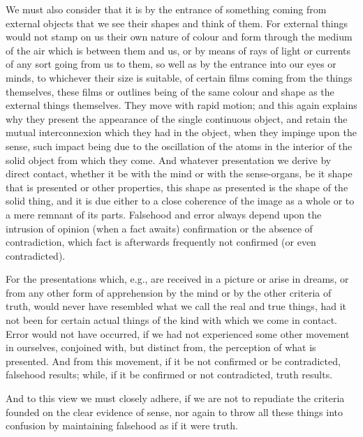 \documentclass{stex}
\begin{document}
We must also consider that it is by the entrance of something coming from external objects that we see their shapes and think of them.
For external things would not stamp on us their own nature of colour and form through the medium of the air which is between them and us, or by means of rays of light or currents of any sort going from us to them, so well as by the entrance into our eyes or minds, to whichever their size is suitable, of certain films coming from the things themselves, these films or outlines being of the same colour and shape as the external things themselves.
They move with rapid motion; and this again explains why they present the appearance of the single continuous object, and retain the mutual interconnexion which they had in the object, when they impinge upon the sense, such impact being due to the oscillation of the atoms in the interior of the solid object from which they come.
And whatever presentation we derive by direct contact, whether it be with the mind or with the sense-organs, be it shape that is presented or other properties, this shape as presented is the shape of the solid thing, and it is due either to a close coherence of the image as a whole or to a mere remnant of its parts.
Falsehood and error always depend upon the intrusion of opinion (when a fact awaits) confirmation or the absence of contradiction, which fact is afterwards frequently not confirmed (or even contradicted).

For the presentations which, e.g., are received in a picture or arise in dreams, or from any other form of apprehension by the mind or by the other criteria of truth, would never have resembled what we call the real and true things, had it not been for certain actual things of the kind with which we come in contact.
Error would not have occurred, if we had not experienced some other movement in ourselves, conjoined with, but distinct from, the perception of what is presented.
And from this movement, if it be not confirmed or be contradicted, falsehood results; while, if it be confirmed or not contradicted, truth results.

And to this view we must closely adhere, if we are not to repudiate the criteria founded on the clear evidence of sense, nor again to throw all these things into confusion by maintaining falsehood as if it were truth.
\end{document}
